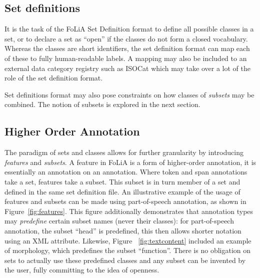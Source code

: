 \documentclass[a4paper,10pt,twoside]{article}
\begin{document}



\subsection{Set definitions}
\label{sec:setdefinitions}

It is the task of the FoLiA Set Definition format to define all possible
classes in a set, or to declare a set as ``open'' if the classes do not form a
closed vocabulary. Whereas the classes are short identifiers, the set
definition format can map each of these to fully human-readable labels. A
mapping may also be included to an external data category registry such as
ISOCat \cite{ISOCAT} which may take over a lot of the role of the set
definition format.

Set definitions format may also pose constraints on how classes of
\emph{subsets} may be combined. The notion of subsets is explored in the next
section.

\subsection{Higher Order Annotation}
\label{sec:higherorder}
\label{sec:features}

The paradigm of sets and classes allows for further granularity by introducing
\emph{features} and \emph{subsets}. A feature in FoLiA is a form of
higher-order annotation, it is essentially an annotation on an annotation.
Where token and span annotations take a set, features take a subset. This
subset is in turn member of a set and defined in the same set definition file.
An illustrative example of the usage of features and subsets can be made using
part-of-speech annotation, as shown in Figure~\ref{fig:features}. This figure
additionally demonstrates that annotation types may \emph{predefine} certain subset
names (never their classes): for part-of-speech annotation, the subset ``head''
is predefined, this then allows shorter notation using an XML attribute.  Likewise,
Figure~ \ref{fig:textcontent} included an example of morphology, which predefines
the subset ``function''. There is no obligation on sets to actually use these
predefined classes and any subset can be invented by the user, fully committing
to the idea of openness. %
\end{document}
